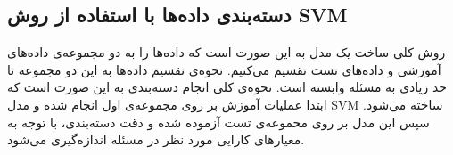 \subsection{دسته‌بندی داده‌ها با استفاده از روش SVM}
روش کلی ساخت یک مدل  به این صورت است که داده‌ها را به دو مجموعه‌ی داده‌های آموزشی و داده‌های تست تقسیم می‌کنیم. نحوه‌ی تقسیم داده‌ها به این دو مجموعه تا حد زیادی به مسئله وابسته است. نحوه‌ی کلی انجام دسته‌بندی به این صورت است که ابتدا عملیات آموزش بر روی مجموعه‌ی اول انجام شده و مدل SVM ساخته می‌شود. سپس این مدل بر روی محموعه‌ی تست آزموده شده و دقت دسته‌بندی، با توجه به معیارهای کارایی مورد نظر در مسئله اندازه‌گیری می‌شود.